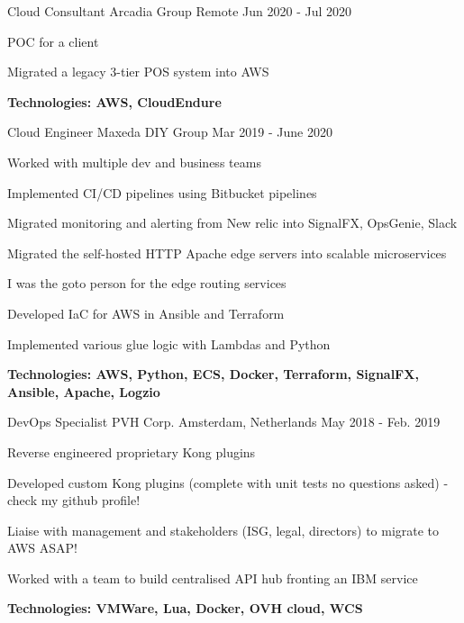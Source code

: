 \begin{cventries}
\begin{minipage}{\dimexpr\textwidth-1cm}
\begin{cventrystack}
	\cventry
	{Cloud Consultant} %
	{Arcadia Group} %
	{Remote} %
	{Jun 2020 - Jul 2020} %
	{ %
		\begin{cvitems}
			\item {POC for a client}
			\item {Migrated a legacy 3-tier POS system into AWS}
			\item {\bfseries{Technologies:} AWS, CloudEndure}
		\end{cvitems}
	}

	\cventry
	{Cloud Engineer} %
	{Maxeda DIY Group} %
	{} %
	{Mar 2019 - June 2020} %
	{ %
		\begin{cvitems}
			\item {Worked with multiple dev and business teams}
			\item {Implemented CI/CD pipelines using Bitbucket pipelines}
			\item {Migrated monitoring and alerting from New relic into SignalFX, OpsGenie, Slack}
			\item {Migrated the self-hosted HTTP Apache edge servers into scalable microservices}
			\item {I was the goto person for the edge routing services}
			\item {Developed IaC for AWS in Ansible and Terraform}
			\item {Implemented various glue logic with Lambdas and Python}
			\item {\bfseries{Technologies:} AWS, Python, ECS, Docker, Terraform, SignalFX, Ansible, Apache, Logzio}
		\end{cvitems}
	}

\end{cventrystack}
\end{minipage}


\cventry
{DevOps Specialist} %
{PVH Corp.} %
{Amsterdam, Netherlands} %
{May 2018 - Feb. 2019} %
{ %
	\begin{cvitems}
	\item {Reverse engineered proprietary Kong plugins}
	\item {Developed custom Kong plugins (complete with unit tests no questions asked) - check my github profile!}
	\item {Liaise with management and stakeholders (ISG, legal, directors) to migrate to AWS ASAP!}
	\item {Worked with a team to build centralised API hub fronting an IBM service}
	\item {\bfseries{Technologies:} VMWare, Lua, Docker, OVH cloud, WCS}
	\end{cvitems}
}


\end{cventries}
